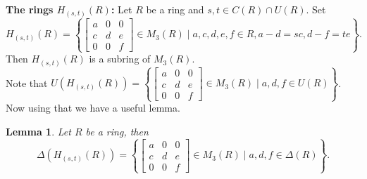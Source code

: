 \documentclass[12pt, reqno]{amsart}
\newtheorem{lem}[thm]{Lemma}
\numberwithin{equation}{section}
\begin{document}

{\bf The rings $H_{(s,t)}(R)$:} Let $R$ be a ring and  $s, t\in
C(R)\cap U(R)$. Set {\footnotesize$$H_{(s,t)}(R) = \left
\{\begin{bmatrix}a&0&0\\c&d&e\\0&0&f
\end{bmatrix}\in M_3(R)\mid a, c, d, e, f\in R, a - d = sc, d - f = te\right \}.$$}
Then $H_{(s,t)}(R)$ is a subring of $M_3(R)$.\\
Note that $U(H_{(s,t)}(R))=\left
\{\begin{bmatrix}a&0&0\\c&d&e\\0&0&f
\end{bmatrix}\in M_3(R)\mid a, d, f\in U(R)\right \}$. Now using that we have a useful lemma.

\begin{lem}\label{Hst}
    Let $R$ be a ring, then $$\Delta (H_{(s,t)}(R)) =\left
\{\begin{bmatrix}a&0&0\\c&d&e\\0&0&f
\end{bmatrix}\in M_3(R)\mid a, d, f\in \Delta(R)\right \}. $$
\end{lem}
\end{document}
